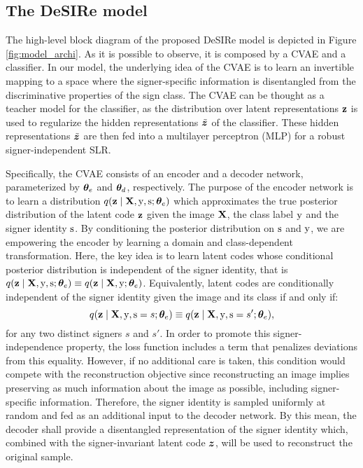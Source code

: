 \subsection{The DeSIRe model}
\label{sec:desire_method}
The high-level block diagram of the proposed DeSIRe model is depicted in Figure \ref{fig:model_archi}. As it is possible to observe, it is composed by a CVAE and a classifier. In our model, the underlying idea of the CVAE is to learn an invertible mapping to a space where the signer-specific information is disentangled from the discriminative properties of the sign class. The CVAE can be thought as a teacher model for the classifier, as the distribution over latent representations ${\mathbf{z}}$ is used to regularize the hidden representations $\tilde{{\bm{z}}}$ of the classifier. These hidden representations $\tilde{{\bm{z}}}$ are then fed into a multilayer perceptron (MLP) for a robust signer-independent SLR.

Specifically, the CVAE consists of an encoder and a decoder network, parameterized by ${\bm{\theta}}_e$ and ${\bm{\theta}}_d$, respectively. The purpose of the encoder network is to learn a distribution $q({\mathbf{z}} \mid {\mathbf{X}}, {\textnormal{y}}, {\textnormal{s}}; {\bm{\theta}}_e)$ which approximates the true posterior distribution of the latent code ${\mathbf{z}}$ given the image ${\mathbf{X}}$, the class label ${\textnormal{y}}$ and the signer identity ${\textnormal{s}}$. By conditioning the posterior distribution on ${\textnormal{s}}$ and ${\textnormal{y}}$, we are empowering the encoder by learning a domain and class-dependent transformation. Here, the key idea is to learn latent codes whose conditional posterior distribution is independent of the signer identity, that is $q({\mathbf{z}} \mid {\mathbf{X}}, {\textnormal{y}}, {\textnormal{s}}; {\bm{\theta}}_e) \equiv q({\mathbf{z}} \mid {\mathbf{X}}, {\textnormal{y}}; {\bm{\theta}}_e)$. Equivalently, latent codes are conditionally independent of the signer identity given the image and its class if and only if:
\begin{equation}
    \label{eq:independence}
    q({\mathbf{z}} \mid {\mathbf{X}}, {\textnormal{y}}, {\textnormal{s}}=s; {\bm{\theta}}_e) \equiv q({\mathbf{z}} \mid {\mathbf{X}}, {\textnormal{y}}, {\textnormal{s}}=s'; {\bm{\theta}}_e),
\end{equation}
for any two distinct signers $s$ and $s'$. In order to promote this signer-independence property, the loss function includes a term that penalizes deviations from this equality. However, if no additional care is taken, this condition would compete with the reconstruction objective since reconstructing an image implies preserving as much information about the image as possible, including signer-specific information. Therefore, the signer identity is sampled uniformly at random and fed as an additional input to the decoder network. By this mean, the decoder shall provide a disentangled representation of the signer identity which, combined with the signer-invariant latent code ${\bm{z}}$, will be used to reconstruct the original sample.

